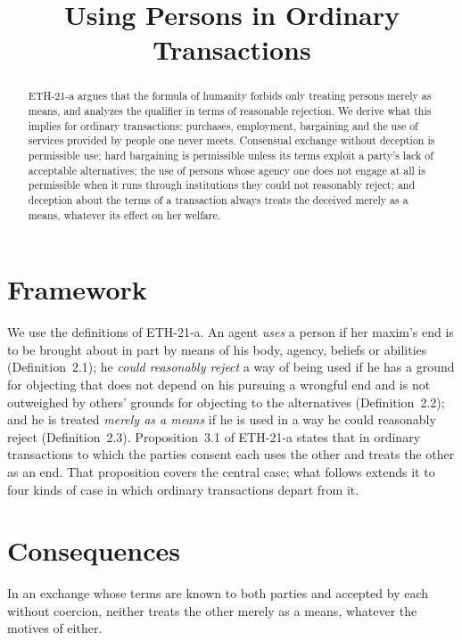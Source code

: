 \documentclass{situationist-preprint}
\title{Using Persons in Ordinary Transactions}
\begin{document}
\maketitle

\begin{abstract}
ETH-21-a argues that the formula of humanity forbids only treating persons merely as means, and analyzes the qualifier in terms of reasonable rejection. We derive what this implies for ordinary transactions: purchases, employment, bargaining and the use of services provided by people one never meets. Consensual exchange without deception is permissible use; hard bargaining is permissible unless its terms exploit a party's lack of acceptable alternatives; the use of persons whose agency one does not engage at all is permissible when it runs through institutions they could not reasonably reject; and deception about the terms of a transaction always treats the deceived merely as a means, whatever its effect on her welfare.
\end{abstract}

\section{Framework}

We use the definitions of ETH-21-a. An agent \emph{uses} a person if her maxim's end is to be brought about in part by means of his body, agency, beliefs or abilities (Definition~2.1); he \emph{could reasonably reject} a way of being used if he has a ground for objecting that does not depend on his pursuing a wrongful end and is not outweighed by others' grounds for objecting to the alternatives (Definition~2.2); and he is treated \emph{merely as a means} if he is used in a way he could reasonably reject (Definition~2.3). Proposition~3.1 of ETH-21-a states that in ordinary transactions to which the parties consent each uses the other and treats the other as an end. That proposition covers the central case; what follows extends it to four kinds of case in which ordinary transactions depart from it.

\section{Consequences}

\begin{proposition}\label{p:exchange}
In an exchange whose terms are known to both parties and accepted by each without coercion, neither treats the other merely as a means, whatever the motives of either.
\end{proposition}
\end{document}
